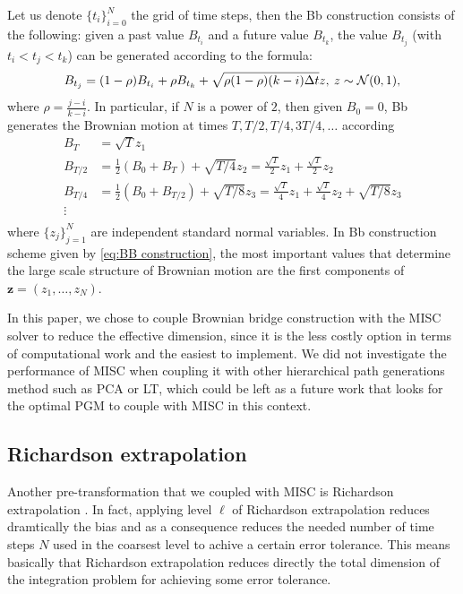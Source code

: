 Let us denote $\{t_i\}_{i=0}^{N}$ the grid of time steps, then the Bb construction \cite{glasserman2004monte} consists of the following: given a past value $B_{t_i}$ and a future value $B_{t_k}$, the value $B_{t_j}$ (with $t_i < t_j < t_k$) can be generated according to the formula:
\begin{equation}
B_{t_j}=(1-\rho) B_{t_i}+\rho B_{t_k}+ \sqrt{\rho (1-\rho)(k-i) \Delta t} z, \: z \sim \mathcal{N}(0,1) ,
\end{equation}
where $\rho=\frac{j-i}{k-i}$.  In particular, if $N$ is a power of $2$, then given $B_0=0$, Bb generates the Brownian motion at times $T, T/2,T/4,3T/4,\dots$ according
\begin{align}\label{eq:BB construction}
	B_T&=\sqrt{T}z_1\nonumber\\
	B_{T/2}&= \frac{1}{2}(B_{0}+B_{T})+\sqrt{T/4}z_2= \frac{\sqrt{T}}{2} z_1+\frac{\sqrt{T}}{2} z_2\nonumber\\
	B_{T/4}&=\frac{1}{2} (B_{0}+B_{T/2})+\sqrt{T/8}z_3= \frac{\sqrt{T}}{4} z_1+\frac{\sqrt{T}}{4} z_2+\sqrt{T/8}z_3\nonumber\\
	\vdots \nonumber\\
\end{align}
where $\{z_j\}_{j=1}^{N}$ are independent standard normal variables.  In Bb construction scheme given by \eqref{eq:BB construction}, the most important values that determine the large scale structure of Brownian motion are the first components of $\mathbf{z} = (z_1,\dots,z_N)$.



\begin{remark}
In this paper, we chose to couple Brownian bridge construction with the MISC solver to reduce the effective dimension, since it is the less costly option in terms of computational work and the easiest to implement. We did not investigate the performance of MISC when coupling it with other hierarchical path generations method such as PCA or LT, which could be left as a future work that looks for the optimal PGM to couple with MISC in this context.
\end{remark}



\subsection{Richardson extrapolation}\label{sec:Richardson extrapolation}


Another  pre-transformation that we coupled with MISC is Richardson extrapolation \cite{talay1990expansion}. In fact, applying level $\ell$ of Richardson extrapolation reduces dramtically the bias and as a consequence reduces the needed number of time steps $N$ used in the coarsest level to achive a certain error tolerance. This means basically that Richardson extrapolation reduces directly the total dimension of the integration problem for achieving some error tolerance.


